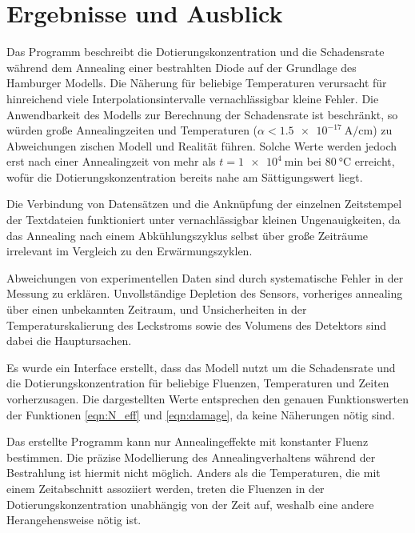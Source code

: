 \chapter{Ergebnisse und Ausblick}
Das Programm beschreibt die Dotierungskonzentration und die Schadensrate während dem
Annealing einer bestrahlten Diode
auf der Grundlage des Hamburger Modells. Die Näherung für beliebige
Temperaturen verursacht für hinreichend viele Interpolationsintervalle
vernachlässigbar kleine Fehler. Die Anwendbarkeit des Modells zur Berechnung der Schadensrate ist
beschränkt, so würden große Annealingzeiten und Temperaturen ($\alpha < \SI{1.5e-17}{\ampere\per\centi\meter}$) zu Abweichungen
zischen Modell und Realität führen. Solche Werte werden jedoch erst nach
einer Annealingzeit von mehr als $t=\SI{1e4}{\minute}$ bei $\SI{80}{\celsius}$ erreicht, wofür
die Dotierungskonzentration bereits nahe am Sättigungswert liegt.

Die Verbindung von Datensätzen und die Anknüpfung der einzelnen Zeitstempel der
Textdateien funktioniert unter vernachlässigbar kleinen Ungenauigkeiten, da das Annealing
nach einem Abkühlungszyklus selbst über große Zeiträume irrelevant im Vergleich zu
den Erwärmungszyklen.

Abweichungen von experimentellen Daten sind durch systematische Fehler in der Messung
zu erklären. Unvollständige Depletion des Sensors, vorheriges annealing über einen
unbekannten Zeitraum, und Unsicherheiten in der Temperaturskalierung des Leckstroms sowie
des Volumens des Detektors sind dabei die Hauptursachen.

Es wurde ein Interface erstellt, dass das Modell nutzt um die Schadensrate und die Dotierungskonzentration
für beliebige Fluenzen, Temperaturen und
Zeiten vorherzusagen. Die dargestellten Werte entsprechen den genauen Funktionswerten
der Funktionen \ref{eqn:N_eff} und \ref{eqn:damage}, da keine Näherungen nötig sind.


Das erstellte Programm kann nur Annealingeffekte mit konstanter Fluenz
bestimmen. Die präzise Modellierung des Annealingverhaltens während der Bestrahlung
ist hiermit nicht möglich. Anders als die Temperaturen, die mit einem Zeitabschnitt
assoziiert werden, treten die Fluenzen in der Dotierungskonzentration
unabhängig von der Zeit auf, weshalb eine andere Herangehensweise nötig ist.
